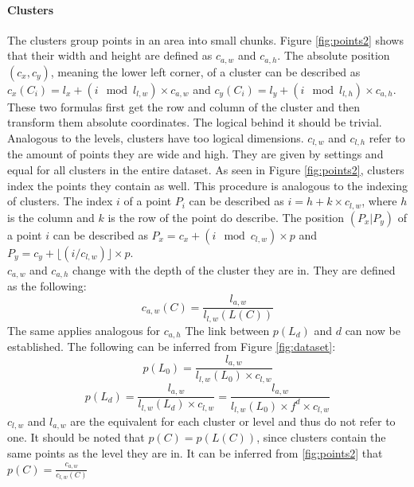 \documentclass[12pt,a4paper,titlepage]{article}
\begin{document}
	\paragraph{Clusters}\label{sec:clusters}
	The clusters group points in an area into small chunks. Figure \ref{fig:points2} shows that their width and height are defined as \(c_{a,w}\) and \(c_{a,h}\). The absolute position \((c_x,c_y)\), meaning the lower left corner, of a cluster can be described as \(c_x(C_i) = l_x + (i \mod l_{l,w}) \times c_{a,w}\) and \(c_y(C_i) = l_y + (i \mod l_{l,h}) \times c_{a,h}\). These two formulas first get the row and column of the cluster and then transform them absolute coordinates. The logical behind it should be trivial.\\	
	Analogous to the levels, clusters have too logical dimensions. \(c_{l,w}\) and \(c_{l,h}\) refer to the amount of points they are wide and high. They are given by settings and equal for all clusters in the entire dataset. As seen in Figure \ref{fig:points2}, clusters index the points they contain as well. This procedure is analogous to the indexing of clusters. The index \(i\) of a point \(P_i\) can be described as \(i = h + k \times c_{l,w}\), where \(h\) is the column and \(k\) is the row of the point do describe. The position \((P_x|P_y)\) of a point \(i\) can be described as \(P_x = c_x + (i \mod c_{l,w}) \times p\) and \(P_y = c_y + \lfloor (i / c_{l,w}) \rfloor \times p\).\\
	\(c_{a,w}\) and \(c_{a,h}\) change with the depth of the cluster they are in. They are defined as the following:
	\[c_{a,w}(C) = \frac{l_{a,w}}{l_{l,w}(L(C))}\]
	The same applies analogous for \(c_{a,h}\)
	The link between \(p(L_d)\) and \(d\) can now be established. The following can be inferred from Figure \ref{fig:dataset}:
	\[p(L_0) = \frac{l_{a,w}}{l_{l,w}(L_0) \times c_{l,w}}\]
	\[p(L_d) = \frac{l_{a,w}}{l_{l,w}(L_d) \times c_{l,w}} = \frac{l_{a,w}}{l_{l,w}(L_0) \times f^d \times c_{l,w}}\]
	\(c_{l,w}\) and \(l_{a,w}\) are the equivalent for each cluster or level and thus do not refer to one. It should be noted that \(p(C) = p(L(C))\), since clusters contain the same points as the level they are in. It can be inferred from \ref{fig:points2} that \(p(C) = \frac{c_{a,w}}{c_{l,w}(C)}\)\\
\end{document}
